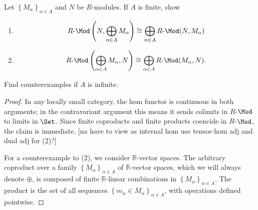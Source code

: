 \documentclass[11pt, letterpaper]{article}
\begin{document}
\begin{problem}
	Let $\left\{ M_\alpha  \right\} _{\alpha \in A} $ and $N$ be $R$-modules. If $A$ is finite, show
	\begin{enumerate}
		\item 
		\[
				R\text{-} \Mod\left( N,\bigoplus_{\alpha \in A} M_\alpha  \right) \cong \bigoplus_{\alpha \in A} R\text{-} \Mod(N,M_\alpha )
			\]
		\item
			\[
				R\text{-} \Mod\left( \bigoplus_{\alpha \in A} M_\alpha ,N \right) \cong \bigoplus_{\alpha \in A} R\text{-} \Mod(M_\alpha ,N)
			.\]
	\end{enumerate}
	Find counterexamples if $A$ is infinite.
\end{problem}
\begin{proof}
	In any locally small category, the hom functor is continuous in both arguments; in the contravariant argument this means it sends colimits in $R$-$\Mod$ to limits in $\Set $. Since finite coproducts and finite products coencide in $R$-$\Mod$, the claim is immediate. [na have to view as internal hom use tensor-hom adj and dual adj for (2)?]

	For a counterexample to (2), we consider $\mathbb{R} $-vector spaces. The arbitrary coproduct over a family $\left\{ M_\alpha  \right\}_{\alpha \in A} $ of $\mathbb{R} $-vector spaces, which we will always denote $\oplus $, is composed of finite $\mathbb{R} $-linear combinations in $\left\{ M_\alpha  \right\}_{\alpha \in A} $. The product is the set of all sequences $\left\{ m_\alpha \in M_\alpha  \right\}_{\alpha \in A} $, with operations defined pointwise.


\end{proof}
\end{document}
